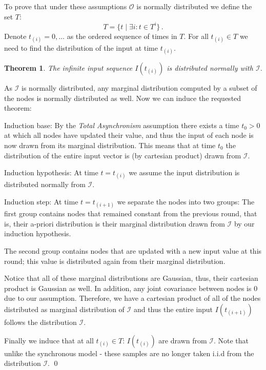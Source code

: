 \documentclass[preprint,12pt]{elsarticle}
\newtheorem{theorem}{Theorem}
\newenvironment{proof}{\noindent{\bf Proof:~~}}{}
\newcommand{\Ir}[1]{I(#1)}
\begin{document}
To prove that under these assumptions $\mathcal{O}$ is normally distributed we define the set $T$:
\begin{equation*}
  T = \{t \mid \exists i:t \in T^i\}\,.
\end{equation*}
Denote $t_{(i)}=0,\ldots$ as the ordered sequence of times in $T$.
For all $t_{(i)} \in T$ we need to find the distribution of the input at time $t_{(i)}$.
\begin{theorem}\label{theorem:main3}
The infinite input sequence $\Ir{t_{(i)}}$ is distributed normally with $\mathcal{I}$.
\end{theorem}
\begin{proof}
As $\mathcal{I}$ is normally distributed, any marginal distribution computed by a subset of the nodes is normally distributed as well. Now we can induce the requested theorem:

Induction base: By the {\em Total Asynchronism} assumption there exists a time $t_0>0$ at which all nodes have updated their value, and thus the input of each node is now drawn from its marginal distribution. This means that at time $t_0$ the distribution of the entire input vector is (by cartesian product) drawn from $\mathcal{I}$.

Induction hypothesis: At time $t=t_{(i)}$ we assume the input distribution is distributed normally from $\mathcal{I}$.

Induction step: At time $t=t_{(i+1)}$ we separate the nodes into two groups:
  The first group contains nodes that remained constant from the previous round, that is, their a-priori distribution is their marginal distribution drawn from $\mathcal{I}$ by our induction hypothesis.

  The second group contains nodes that are updated with a new input value at this round; this value is distributed again from their marginal distribution.

  Notice that all of these marginal distributions are Gaussian, thus, their cartesian product is Gaussian as well. In addition, any joint covariance between nodes is $0$ due to our assumption. Therefore, we have a cartesian product of all of the nodes distributed as marginal distribution of $\mathcal{I}$ and thus the entire input $\Ir{t_{(i+1)}}$ follows the distribution $\mathcal{I}$.

    Finally we induce that at all $t_{(i)} \in T$: $\Ir{t_{(i)}}$ are drawn from $\mathcal{I}$. Note that unlike the synchronous model - these samples are no longer taken i.i.d from the distribution $\mathcal{I}$.
\qed\end{proof}
\end{document}
